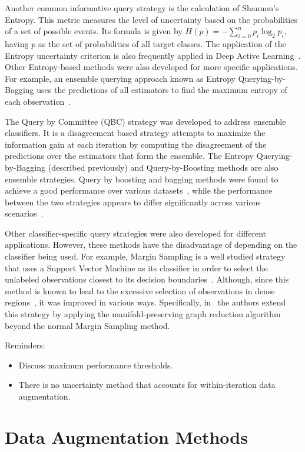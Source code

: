 \documentclass[parskip=full]{scrartcl}
\begin{document}
Another common informative query strategy is the calculation of Shannon's
Entropy. This metric measures the level of uncertainty
based on the probabilities of a set of possible events. Its formula is given
by $H(p)=-\sum_{i=0}^n{p_i\log_2{p_i}}$, having $p$ as the set of
probabilities of all target classes. The application of the Entropy
uncertainty criterion is also frequently applied in Deep Active
Learning~\cite{Aghdam2019}. Other Entropy-based methods were also developed
for more specific applications. For example, an ensemble querying approach
known as Entropy Querying-by-Bagging uses the predictions of all estimators to
find the maximum entropy of each observation~\cite{Abe1998}.

The Query by Committee (QBC) strategy was developed to address ensemble
classifiers. It is a disagreement based strategy attempts to maximize the
information gain at each iteration by computing the disagreement of the
predictions over the estimators that form the ensemble. The Entropy
Querying-by-Bagging (described previously) and Query-by-Boosting methods are
also ensemble strategies. Query by boosting and bagging methods were found to
achieve a good performance over various datasets~\cite{Melville2004}, while
the performance between the two strategies appears to differ significantly
across various scenarios~\cite{Bloodgood2018}.

Other classifier-specific query strategies were also developed for different
applications. However, these methods have the disadvantage of depending on the
classifier being used. For example, Margin Sampling is a well studied
strategy that uses a Support Vector Machine as its classifier
in order to select the unlabeled observations closest to its decision
boundaries~\cite{Kumar2020}. Although, since this method is known to lead
to the excessive selection of observations in dense regions~\cite{Zhou2014},
it was improved in various ways. Specifically, in~\cite{Zhou2014} the authors
extend this strategy by applying the manifold-preserving graph reduction
algorithm beyond the normal Margin Sampling method.

Reminders:
\begin{itemize}
    \item Discuss maximum performance thresholds.
    \item There is no uncertainty method that accounts for within-iteration
        data augmentation.
\end{itemize}


\section{Data Augmentation Methods}
\end{document}
